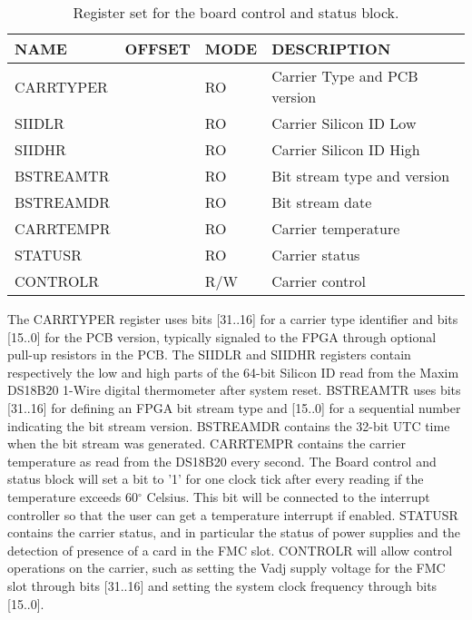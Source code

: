 \documentclass{article}
\begin{document}
\begin{table}[htbp]
  \centering
  \begin{tabularx}{\textwidth}{|l|r|l|X|}
    \hline
    \textbf{NAME} & \textbf{OFFSET} & \textbf{MODE} & \textbf{DESCRIPTION} \\
    \hline
    \hline
    CARRTYPER & & RO & Carrier Type and PCB version\\
    \hline
    SIIDLR & & RO & Carrier Silicon ID Low \\
    \hline
    SIIDHR & & RO & Carrier Silicon ID High \\
    \hline
    BSTREAMTR & & RO & Bit stream type and version \\
    \hline
    BSTREAMDR & & RO & Bit stream date \\
    \hline
    CARRTEMPR & & RO & Carrier temperature \\
    \hline
    STATUSR & & RO & Carrier status \\
    \hline
    CONTROLR & & R/W & Carrier control \\
    \hline
  \end{tabularx}
  \caption{Register set for the board control and status block.}
  \label{tab:stat_control}
\end{table}

The CARRTYPER register uses bits [31..16] for a carrier type identifier and bits [15..0] for the PCB version, typically signaled to the FPGA through optional pull-up resistors in the PCB. The SIIDLR and SIIDHR registers contain respectively the low and high parts of the 64-bit Silicon ID read from the Maxim DS18B20 1-Wire digital thermometer after system reset. BSTREAMTR uses bits [31..16] for defining an FPGA bit stream type and [15..0] for a sequential number indicating the bit stream version. BSTREAMDR contains the 32-bit UTC time when the bit stream was generated. CARRTEMPR contains the carrier temperature as read from the DS18B20 every second. The Board control and status block will set a bit to '1' for one clock tick after every reading if the temperature exceeds 60$^\circ$ Celsius. This bit will be connected to the interrupt controller so that the user can get a temperature interrupt if enabled. STATUSR contains the carrier status, and in particular the status of power supplies and the detection of presence of a card in the FMC slot. CONTROLR will allow control operations on the carrier, such as setting the Vadj supply voltage for the FMC slot through bits [31..16] and setting the system clock frequency through bits [15..0].
\end{document}
